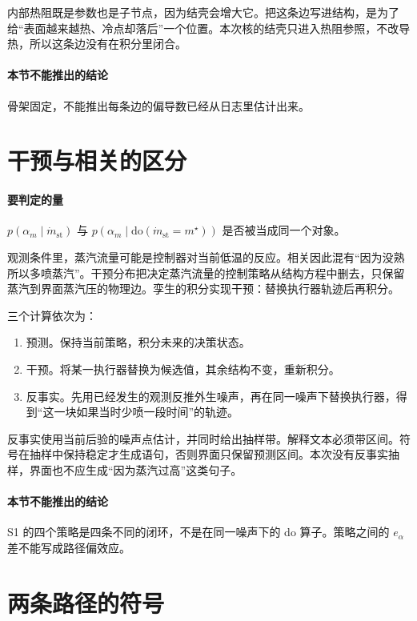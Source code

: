 内部热阻既是参数也是子节点，因为结壳会增大它。把这条边写进结构，是为了给“表面越来越热、冷点却落后”一个位置。本次核的结壳只进入热阻参照，不改导热，所以这条边没有在积分里闭合。

\paragraph{本节不能推出的结论}
骨架固定，不能推出每条边的偏导数已经从日志里估计出来。

\section{干预与相关的区分}

\paragraph{要判定的量}
\(p(\alpha_m\mid \dot m_{\mathrm{st}})\) 与 \(p(\alpha_m\mid\mathrm{do}(\dot m_{\mathrm{st}}=m^\star))\) 是否被当成同一个对象。

观测条件里，蒸汽流量可能是控制器对当前低温的反应。相关因此混有“因为没熟所以多喷蒸汽”。干预分布把决定蒸汽流量的控制策略从结构方程中删去，只保留蒸汽到界面蒸汽压的物理边。孪生的积分实现干预：替换执行器轨迹后再积分。

三个计算依次为：

\begin{enumerate}
\item 预测。保持当前策略，积分未来的决策状态。
\item 干预。将某一执行器替换为候选值，其余结构不变，重新积分。
\item 反事实。先用已经发生的观测反推外生噪声，再在同一噪声下替换执行器，得到“这一块如果当时少喷一段时间”的轨迹。
\end{enumerate}

反事实使用当前后验的噪声点估计，并同时给出抽样带。解释文本必须带区间。符号在抽样中保持稳定才生成语句，否则界面只保留预测区间。本次没有反事实抽样，界面也不应生成“因为蒸汽过高”这类句子。

\paragraph{本节不能推出的结论}
S1 的四个策略是四条不同的闭环，不是在同一噪声下的 do 算子。策略之间的 \(e_{\alpha}\) 差不能写成路径偏效应。

\section{两条路径的符号}

